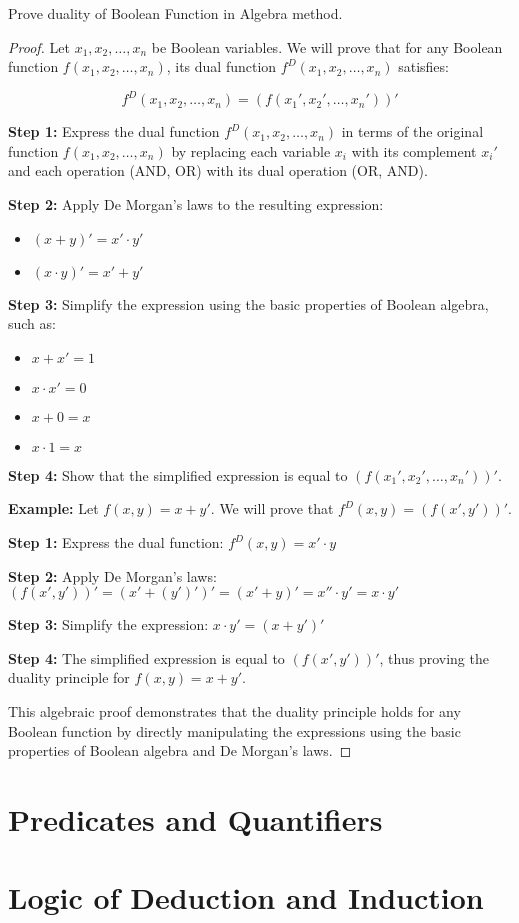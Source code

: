     \begin{exercise}
        Prove duality of Boolean Function in Algebra method.
    \end{exercise}
    \begin{proof}
        Let $x_1, x_2, \ldots, x_n$ be Boolean variables. We will prove that for any Boolean function $f(x_1, x_2, \ldots, x_n)$, its dual function $f^D(x_1, x_2, \ldots, x_n)$ satisfies:

\[f^D(x_1, x_2, \ldots, x_n) = (f(x_1', x_2', \ldots, x_n'))'\]

\textbf{Step 1:} Express the dual function $f^D(x_1, x_2, \ldots, x_n)$ in terms of the original function $f(x_1, x_2, \ldots, x_n)$ by replacing each variable $x_i$ with its complement $x_i'$ and each operation (AND, OR) with its dual operation (OR, AND).

\textbf{Step 2:} Apply De Morgan's laws to the resulting expression:
\begin{itemize}
    \item $(x + y)' = x' \cdot y'$
    \item $(x \cdot y)' = x' + y'$
\end{itemize}

\textbf{Step 3:} Simplify the expression using the basic properties of Boolean algebra, such as:
\begin{itemize}
    \item $x + x' = 1$
    \item $x \cdot x' = 0$
    \item $x + 0 = x$
    \item $x \cdot 1 = x$
\end{itemize}

\textbf{Step 4:} Show that the simplified expression is equal to $(f(x_1', x_2', \ldots, x_n'))'$.

\textbf{Example:}
Let $f(x, y) = x + y'$. We will prove that $f^D(x, y) = (f(x', y'))'$.

\textbf{Step 1:} Express the dual function:
$f^D(x, y) = x' \cdot y$

\textbf{Step 2:} Apply De Morgan's laws:
$(f(x', y'))' = (x' + (y')')' = (x' + y)' = x'' \cdot y' = x \cdot y'$

\textbf{Step 3:} Simplify the expression:
$x \cdot y' = (x + y')'$

\textbf{Step 4:} The simplified expression is equal to $(f(x', y'))'$, thus proving the duality principle for $f(x, y) = x + y'$.

This algebraic proof demonstrates that the duality principle holds for any Boolean function by directly manipulating the expressions using the basic properties of Boolean algebra and De Morgan's laws.
    \end{proof}


    \section{Predicates and Quantifiers}


    \section{Logic of Deduction and Induction}